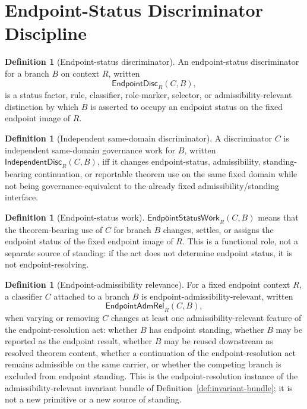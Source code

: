 \documentclass[11pt]{article}
\theoremstyle{definition}
\newtheorem{definition}[theorem]{Definition}
\theoremstyle{remark}
\newcommand{\EndpointDisc}{\mathsf{EndpointDisc}}
\newcommand{\IndDisc}{\mathsf{IndependentDisc}}
\newcommand{\EndpointStatusWork}{\mathsf{EndpointStatusWork}}
\newcommand{\EndpointAdmRel}{\mathsf{EndpointAdmRel}}
\begin{document}
\section{Endpoint-Status Discriminator Discipline}\label{sec:discriminator-discipline}

\begin{definition}[Endpoint-status discriminator]\label{def:endpoint-discriminator}
An endpoint-status discriminator for a branch \(B\) on context \(R\), written
\[
  \EndpointDisc_R(C,B),
\]
is a status factor, rule, classifier, role-marker, selector, or admissibility-relevant distinction by which \(B\) is asserted to occupy an endpoint status on the fixed endpoint image of \(R\).
\end{definition}

\begin{definition}[Independent same-domain discriminator]\label{def:independent-discriminator}
A discriminator \(C\) is independent same-domain governance work for \(B\), written \(\IndDisc_R(C,B)\), iff it changes endpoint-status, admissibility, standing-bearing continuation, or reportable theorem use on the same fixed domain while not being governance-equivalent to the already fixed admissibility/standing interface.
\end{definition}

\begin{definition}[Endpoint-status work]\label{def:endpoint-status-work}
\(\EndpointStatusWork_R(C,B)\) means that the theorem-bearing use of \(C\) for branch \(B\) changes, settles, or assigns the endpoint status of the fixed endpoint image of \(R\). This is a functional role, not a separate source of standing: if the act does not determine endpoint status, it is not endpoint-resolving.
\end{definition}


\begin{definition}[Endpoint-admissibility relevance]\label{def:endpoint-admissibility-relevance}
For a fixed endpoint context \(R\), a classifier \(C\) attached to a branch \(B\) is endpoint-admissibility-relevant, written
\[
  \EndpointAdmRel_R(C,B),
\]
when varying or removing \(C\) changes at least one admissibility-relevant feature of the endpoint-resolution act: whether \(B\) has endpoint standing, whether \(B\) may be reported as the endpoint result, whether \(B\) may be reused downstream as resolved theorem content, whether a continuation of the endpoint-resolution act remains admissible on the same carrier, or whether the competing branch is excluded from endpoint standing. This is the endpoint-resolution instance of the admissibility-relevant invariant bundle of Definition~\ref{def:invariant-bundle}; it is not a new primitive or a new source of standing.
\end{definition}
\end{document}
